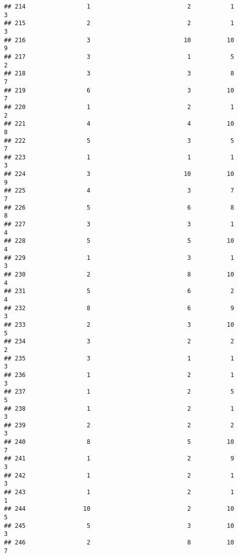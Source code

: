 \documentclass[
]{article}
\begin{document}
\begin{verbatim}
## 214                 1                           2           1               3
## 215                 2                           2           1               3
## 216                 3                          10          10               9
## 217                 3                           1           5               2
## 218                 3                           3           8               7
## 219                 6                           3          10               7
## 220                 1                           2           1               2
## 221                 4                           4          10               8
## 222                 5                           3           5               7
## 223                 1                           1           1               3
## 224                 3                          10          10               9
## 225                 4                           3           7               7
## 226                 5                           6           8               8
## 227                 3                           3           1               4
## 228                 5                           5          10               4
## 229                 1                           3           1               3
## 230                 2                           8          10               4
## 231                 5                           6           2               4
## 232                 8                           6           9               3
## 233                 2                           3          10               5
## 234                 3                           2           2               2
## 235                 3                           1           1               3
## 236                 1                           2           1               3
## 237                 1                           2           5               5
## 238                 1                           2           1               3
## 239                 2                           2           2               3
## 240                 8                           5          10               7
## 241                 1                           2           9               3
## 242                 1                           2           1               3
## 243                 1                           2           1               1
## 244                10                           2          10               5
## 245                 5                           3          10               3
## 246                 2                           8          10               7

\end{verbatim}
\end{document}
